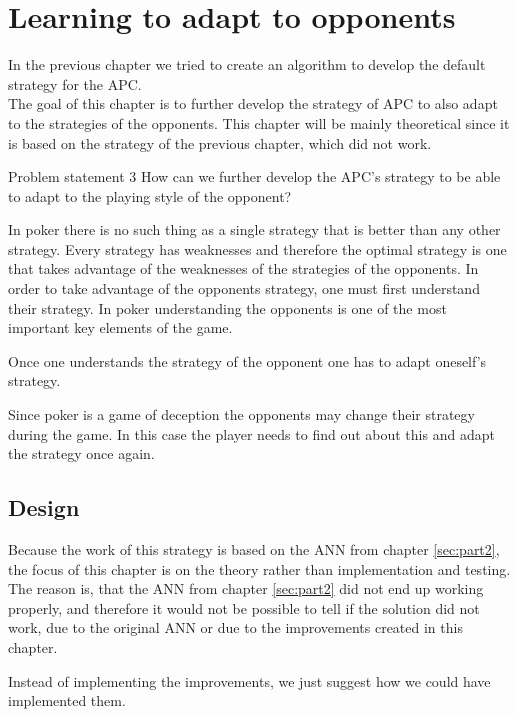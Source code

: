 \section{Learning to adapt to opponents}
\label{sec:part3}

In the previous chapter we tried to create an algorithm to develop the default strategy for the APC. \\

The goal of this chapter is to further develop the strategy of APC to also adapt to the strategies of the opponents. This chapter will be mainly theoretical since it is based on the strategy of the previous chapter, which did not work.

\vspace{4mm}
\begin{statementBox2}{Problem statement 3}
How can we further develop the APC's strategy to be able to adapt to the playing style of the opponent?
\end{statementBox2}
\vspace{4mm} 

In poker there is no such thing as a single strategy that is better than any other strategy. Every strategy has weaknesses and therefore the optimal strategy is one that takes advantage of the weaknesses of the strategies of the opponents. In order to take advantage of the opponents strategy, one must first understand their strategy. In poker understanding the opponents is one of the most important key elements of the game. 

Once one understands the strategy of the opponent one has to adapt oneself's strategy.

Since poker is a game of deception the opponents may change their strategy during the game. In this case the player needs to find out about this and adapt the strategy once again. 

\subsection{Design}
Because the work of this strategy is based on the ANN from chapter \ref{sec:part2}, the focus of this chapter is on the theory rather than implementation and testing. The reason is, that the ANN from chapter \ref{sec:part2} did not end up working properly, and therefore it would not be possible to tell if the solution did not work, due to the original ANN or due to the improvements created in this chapter. 

Instead of implementing the improvements, we just suggest how we could have implemented them.\\

